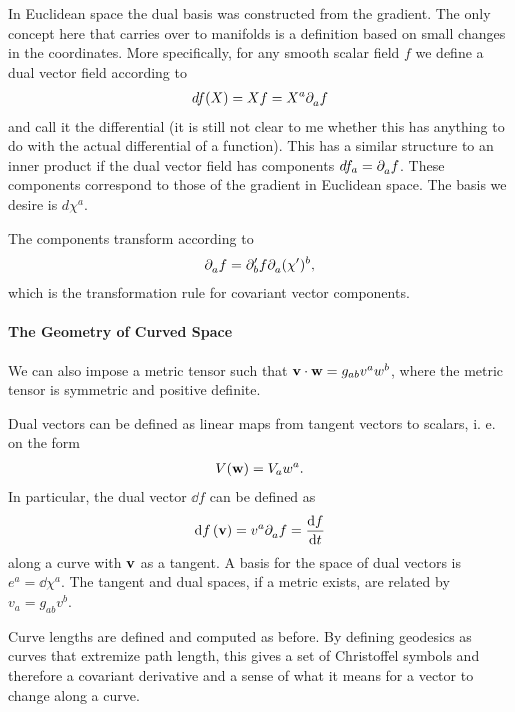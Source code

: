 In Euclidean space the dual basis was constructed from the gradient. The only concept here that carries over to manifolds is a definition based on small changes in the coordinates. More specifically, for any smooth scalar field $f$ we define a dual vector field according to
\begin{align*}
	df(X) = Xf = X^{a}\del{a}{f}
\end{align*}
and call it the differential (it is still not clear to me whether this has anything to do with the actual differential of a function). This has a similar structure to an inner product if the dual vector field has components $df_{a} = \del{a}{f}$. These components correspond to those of the gradient in Euclidean space. The basis we desire is $d\chi^{a}$.

The components transform according to
\begin{align*}
	\del{a}{f} = \del[\prime]{b}{f}\del{a}{(\chi^{\prime})^{b}},
\end{align*}
which is the transformation rule for covariant vector components.

\paragraph{The Geometry of Curved Space}
We can also impose a metric tensor such that $\vb{v}\cdot\vb{w} = g_{ab}v^{a}w^{b}$, where the metric tensor is symmetric and positive definite.

Dual vectors can be defined as linear maps from tangent vectors to scalars, i. e. on the form
\begin{align*}
	V(\vb{w}) = V_{a}w^{a}.
\end{align*}
In particular, the dual vector $\dd{f}$ can be defined as
\begin{align*}
	\dd{f}(\vb{v}) = v^{a}\del{a}{f} = \dv{f}{t}
\end{align*}
along a curve with $\vb{v}$ as a tangent. A basis for the space of dual vectors is $e^{a} = \dd{\chi^{a}}$. The tangent and dual spaces, if a metric exists, are related by $v_{a} = g_{ab}v^{b}$.

Curve lengths are defined and computed as before. By defining geodesics as curves that extremize path length, this gives a set of Christoffel symbols and therefore a covariant derivative and a sense of what it means for a vector to change along a curve.